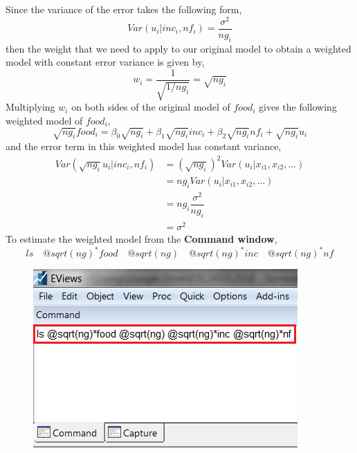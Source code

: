 \documentclass[12pt]{report}
\begin{document}
\noindent Since the variance of the error takes the following form,
$$Var(u_i|inc_i,nf_i)=\dfrac{\sigma^2}{ng_i}$$
\noindent then the weight that we need to apply to our original model to obtain a weighted model with constant error variance is given by,
$$w_i = \dfrac{1}{\sqrt{1/ng_i}} = \sqrt{ng_i}$$
\noindent Multiplying $w_i$ on both sides of the original model of $food_i$ gives the following weighted model of $food_i$,
$$\sqrt{ng_i}food_i = \beta_0\sqrt{ng_i} + \beta_1\sqrt{ng_i}inc_i + \beta_2\sqrt{ng_i}nf_i + \sqrt{ng_i}u_i$$
\noindent and the error term in this weighted model has constant variance,
\begin{align*}
Var(\sqrt{ng_i}u_i|inc_i,nf_i) &= (\sqrt{ng_i})^2Var(u_i|x_{i1},x_{i2},\dots) \\
&= ng_iVar(u_i|x_{i1},x_{i2},\dots) \\
&= ng_i\dfrac{\sigma^2}{ng_i} \\
&= \sigma^2
\end{align*}
\noindent To estimate the weighted model from the \textbf{Command window},
$$ls \quad @sqrt(ng)^*food \quad @sqrt(ng) \quad @sqrt(ng)^*inc \quad @sqrt(ng)^*nf$$
\begin{figure}[H]
	\centering
	\includegraphics{tute10_4}
\end{figure}
\vspace{-\baselineskip}
\end{document}
